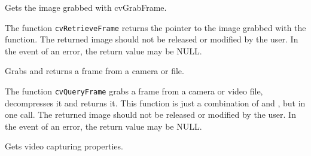 
Gets the image grabbed with cvGrabFrame.


\begin{description}
\end{description}

The function \texttt{cvRetrieveFrame} returns the pointer to the image grabbed with the  function. The returned image should not be released or modified by the user.  In the event of an error, the return value may be NULL.


Grabs and returns a frame from a camera or file.


\begin{description}
\end{description}

The function \texttt{cvQueryFrame} grabs a frame from a camera or video file, decompresses it and returns it. This function is just a combination of  and , but in one call. The returned image should not be released or modified by the user.  In the event of an error, the return value may be NULL.


Gets video capturing properties.


